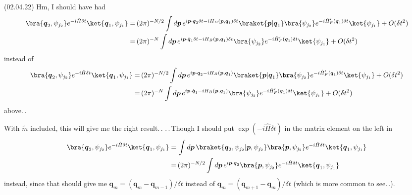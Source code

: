 \documentclass{report}
\begin{document}
\ \\\\\\\\
\indent(02.04.22) Hm, I should have had
\begin{align}
\begin{aligned}
	\bra{\boldsymbol{q}_2, \psi_{j_2}} e^{-i \hat H \delta t} \ket{\boldsymbol{q}_1 , \psi_{j_1}} 
	=&\,
		(2\pi)^{-N/2}
		\int d \boldsymbol{p}\, 
		e^{i \boldsymbol{p} \cdot \boldsymbol{q}_2 \delta t - 
			i H_B(\boldsymbol{p}, \boldsymbol{q}_1) \delta t}
		\braket{\boldsymbol{p} | \boldsymbol{q}_1}
		\bra{\psi_{j_2}}  e^{-i \hat H'_F(\boldsymbol{q}_1) \delta t} \ket{\psi_{j_1}}
		+ O(\delta t^2)
	\\=&\,
		(2\pi)^{-N}
		\int d \boldsymbol{p}\, 
		e^{i \boldsymbol{p} \cdot \dot{\boldsymbol{q}}_1 \delta t - 
			i H_B(\boldsymbol{p}, \boldsymbol{q}_1) \delta t}
		\bra{\psi_{j_2}}  e^{-i \hat H'_F(\boldsymbol{q}_1) \delta t} \ket{\psi_{j_1}}
		+ O(\delta t^2)
\end{aligned}
\end{align} 
instead of 
\begin{align}
\begin{aligned}
	\bra{\boldsymbol{q}_2, \psi_{j_2}} e^{-i \hat H \delta t} \ket{\boldsymbol{q}_1 , \psi_{j_1}} 
	=&\,
		(2\pi)^{-N/2}
		\int d \boldsymbol{p}\, 
		e^{i \boldsymbol{p} \cdot \boldsymbol{q}_2 - i H_B(\boldsymbol{p}, \boldsymbol{q}_1)}
		\braket{\boldsymbol{p} | \boldsymbol{q}_1}
		\bra{\psi_{j_2}}  e^{-i \hat H'_F(\boldsymbol{q}_1) \delta t} \ket{\psi_{j_1}}
		+ O(\delta t^2)
	\\=&\,
		(2\pi)^{-N}
		\int d \boldsymbol{p}\, 
		e^{i \boldsymbol{p} \cdot \dot{\boldsymbol{q}}_1 - i H_B(\boldsymbol{p}, \boldsymbol{q}_1)}
		\bra{\psi_{j_2}}  e^{-i \hat H'_F(\boldsymbol{q}_1) \delta t} \ket{\psi_{j_1}}
		+ O(\delta t^2)
\end{aligned}
\end{align} 
above.\,.

With $\tilde m$ included, this will give me the right result.\,. 
.\,.\,Though I should put $\exp(-i \hat H \delta t)$ in the matrix element on the left in
\begin{align}
\begin{aligned}
	\bra{\boldsymbol{q}_2, \psi_{j_2}} e^{-i \hat H \delta t} \ket{\boldsymbol{q}_1 , \psi_{j_1}} 
	=&\,
		\int d \boldsymbol{p}\, 
		\braket{\boldsymbol{q}_2, \psi_{j_2} | \boldsymbol{p}, \psi_{j_2}} 
		\bra{\boldsymbol{p}, \psi_{j_2}}  e^{-i \hat H \delta t} \ket{\boldsymbol{q}_1, \psi_{j_1}} 
	\\=&\,
		(2\pi)^{-N/2}
		\int d \boldsymbol{p}\, 
		e^{i \boldsymbol{p} \cdot \boldsymbol{q}_2}
		\bra{\boldsymbol{p}, \psi_{j_2}}  e^{-i \hat H \delta t} \ket{\boldsymbol{q}_1, \psi_{j_1}}
\end{aligned}
\end{align} 
instead, since that should give me 
$\dot{\boldsymbol{q}}_m = (\boldsymbol{q}_{m} - \boldsymbol{q}_{m-1}) / \delta t$
instead of
$\dot{\boldsymbol{q}}_m = (\boldsymbol{q}_{m+1} - \boldsymbol{q}_{m}) / \delta t$ (which is more common to see.\,.).
\end{document}
